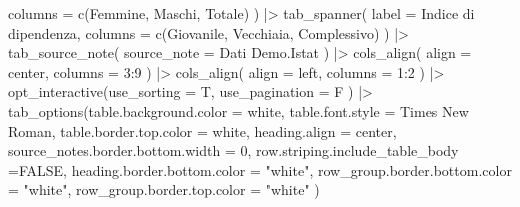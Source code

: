 \documentclass[
]{article}
\newenvironment{Shaded}{\begin{snugshade}}{\end{snugshade}}
\newcommand{\AttributeTok}[1]{\textcolor[rgb]{0.40,0.45,0.13}{#1}}
\newcommand{\ConstantTok}[1]{\textcolor[rgb]{0.56,0.35,0.01}{#1}}
\newcommand{\DecValTok}[1]{\textcolor[rgb]{0.68,0.00,0.00}{#1}}
\newcommand{\FunctionTok}[1]{\textcolor[rgb]{0.28,0.35,0.67}{#1}}
\newcommand{\NormalTok}[1]{\textcolor[rgb]{0.00,0.23,0.31}{#1}}
\newcommand{\SpecialCharTok}[1]{\textcolor[rgb]{0.37,0.37,0.37}{#1}}
\newcommand{\StringTok}[1]{\textcolor[rgb]{0.13,0.47,0.30}{#1}}
\begin{document}
\begin{Shaded}
\begin{Highlighting}[]
    \AttributeTok{columns =} \FunctionTok{c}\NormalTok{(Femmine, Maschi, Totale)}
\NormalTok{  ) }\SpecialCharTok{|\textgreater{}} 
  \FunctionTok{tab\_spanner}\NormalTok{(}
    \AttributeTok{label =} \StringTok{\textquotesingle{}Indice di dipendenza\textquotesingle{}}\NormalTok{,}
    \AttributeTok{columns =} \FunctionTok{c}\NormalTok{(Giovanile, Vecchiaia, }\StringTok{\textasciigrave{}}\AttributeTok{Complessivo}\StringTok{\textasciigrave{}}\NormalTok{)}
\NormalTok{  ) }\SpecialCharTok{|\textgreater{}} 
  \FunctionTok{tab\_source\_note}\NormalTok{(}
    \AttributeTok{source\_note =} \StringTok{\textquotesingle{}Dati Demo.Istat\textquotesingle{}}
\NormalTok{  ) }\SpecialCharTok{|\textgreater{}} 
  \FunctionTok{cols\_align}\NormalTok{(}
    \AttributeTok{align =} \StringTok{\textquotesingle{}center\textquotesingle{}}\NormalTok{,}
    \AttributeTok{columns =} \DecValTok{3}\SpecialCharTok{:}\DecValTok{9}
\NormalTok{  ) }\SpecialCharTok{|\textgreater{}}
  \FunctionTok{cols\_align}\NormalTok{(}
    \AttributeTok{align =} \StringTok{\textquotesingle{}left\textquotesingle{}}\NormalTok{,}
    \AttributeTok{columns =} \DecValTok{1}\SpecialCharTok{:}\DecValTok{2}
\NormalTok{  ) }\SpecialCharTok{|\textgreater{}}
  \FunctionTok{opt\_interactive}\NormalTok{(}\AttributeTok{use\_sorting =}\NormalTok{ T,}
                  \AttributeTok{use\_pagination =}\NormalTok{ F}
\NormalTok{                  ) }\SpecialCharTok{|\textgreater{}}
  \FunctionTok{tab\_options}\NormalTok{(}\AttributeTok{table.background.color =} \StringTok{\textquotesingle{}white\textquotesingle{}}\NormalTok{,}
              \AttributeTok{table.font.style =} \StringTok{\textquotesingle{}Times New Roman\textquotesingle{}}\NormalTok{,}
              \AttributeTok{table.border.top.color =} \StringTok{\textquotesingle{}white\textquotesingle{}}\NormalTok{,}
              \AttributeTok{heading.align =} \StringTok{\textquotesingle{}center\textquotesingle{}}\NormalTok{,}
              \AttributeTok{source\_notes.border.bottom.width =} \DecValTok{0}\NormalTok{, }
              \AttributeTok{row.striping.include\_table\_body =}\ConstantTok{FALSE}\NormalTok{,}
              \AttributeTok{heading.border.bottom.color =} \StringTok{"white"}\NormalTok{,}
              \AttributeTok{row\_group.border.bottom.color =} \StringTok{"white"}\NormalTok{,}
              \AttributeTok{row\_group.border.top.color =} \StringTok{"white"}
\NormalTok{              )}
\end{Highlighting}
\end{Shaded}
\end{document}
